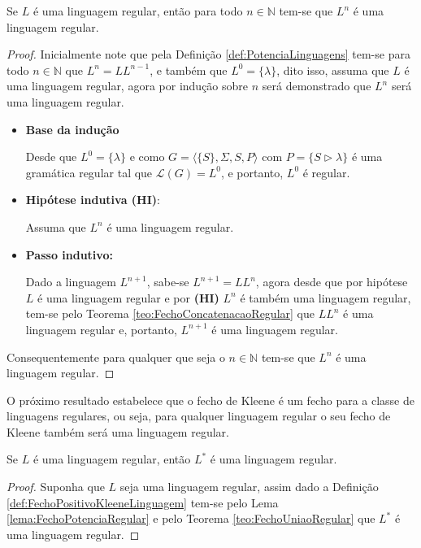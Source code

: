 \begin{lemma}\label{lema:FechoPotenciaRegular}
	Se $L$ é uma linguagem regular, então para todo $n \in \mathbb{N}$ tem-se que $L^n$ é uma linguagem regular.
\end{lemma}

\begin{proof}
	Inicialmente note que pela Definição \ref{def:PotenciaLinguagens} tem-se para todo $n \in \mathbb{N}$ que $L^n = LL^{n-1}$, e também que $L^0 = \{\lambda\}$, dito isso, assuma que $L$ é uma linguagem regular, agora por indução sobre $n$ será demonstrado que $L^n $ será uma linguagem regular.
	
	\begin{itemize}
		\item \textbf{Base da indução}
		
		Desde que $L^0 = \{\lambda\}$ e como $G = \langle \{S\}, \Sigma, S, P\rangle$ com $P = \{S \rhd \lambda \}$ é uma gramática regular tal que $\mathcal{L}(G) =L^0$, e portanto,  $L^0$ é regular.
		
		\item \textbf{Hipótese indutiva (HI)}: 
		
		Assuma que $L^n$ é uma linguagem regular.
		
		\item \textbf{Passo indutivo:}
		
		Dado a linguagem $L^{n+1}$, sabe-se $L^{n+1} = LL^{n}$, agora desde que por hipótese $L$ é uma linguagem regular e por \textbf{(HI)} $L^n$ é também uma linguagem regular, tem-se pelo Teorema \ref{teo:FechoConcatenacaoRegular} que $LL^{n}$ é uma linguagem regular e, portanto, $L^{n+1}$ é uma linguagem regular.
	\end{itemize}
	Consequentemente para qualquer que seja o $n \in \mathbb{N}$ tem-se que $L^n$ é uma linguagem regular.
\end{proof}

O próximo resultado estabelece que o fecho de Kleene é um fecho para a classe de linguagens regulares, ou seja, para qualquer linguagem regular o seu fecho de Kleene também será uma linguagem regular.

\begin{theorem}
	Se $L$ é uma linguagem regular, então $L^*$ é uma linguagem regular.
\end{theorem}

\begin{proof}
	Suponha que $L$ seja uma linguagem regular, assim dado a Definição \ref{def:FechoPositivoKleeneLinguagem} tem-se pelo Lema \ref{lema:FechoPotenciaRegular} e pelo Teorema \ref{teo:FechoUniaoRegular} que $L^*$ é uma linguagem regular.
\end{proof}